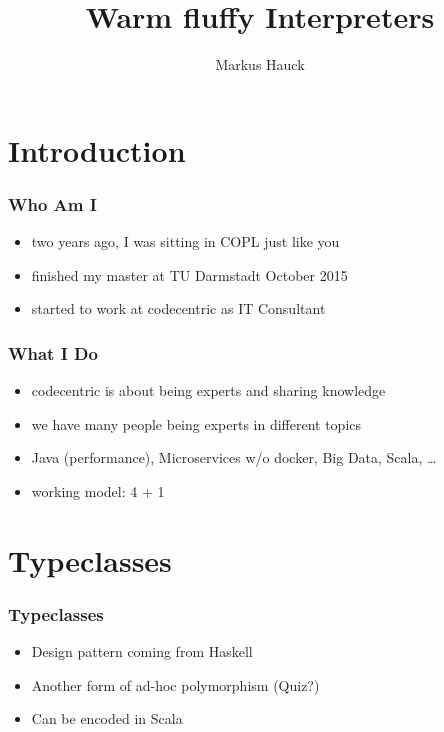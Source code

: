 \documentclass{beamer}
\author{Markus Hauck}
\institute{codecentric AG}
\title{Warm fluffy Interpreters}
\begin{document}
{
  \begin{frame}
    \titlepage{}
  \end{frame}
}

\begin{frame}
  \tableofcontents
\end{frame}


\section{Introduction}

\begin{frame}
  \frametitle{Who Am I}
  \begin{itemize}
  \item two years ago, I was sitting in COPL just like you
  \item finished my master at TU Darmstadt October 2015
  \item started to work at codecentric as IT Consultant
  \end{itemize}
\end{frame}

\begin{frame}
  \frametitle{What I Do}
  \begin{itemize}
  \item codecentric is about being experts and sharing knowledge
  \item we have many people being experts in different topics
  \item Java (performance), Microservices w/o docker, Big Data, Scala,
    \ldots
  \item working model: 4 + 1
  \end{itemize}
\end{frame}

\section{Typeclasses}

\begin{frame}
  \frametitle{Typeclasses}
  \begin{itemize}
  \item Design pattern coming from Haskell
  \item Another form of ad-hoc polymorphism (Quiz?)
  \item Can be encoded in Scala
  \end{itemize}
\end{frame}
\end{document}

